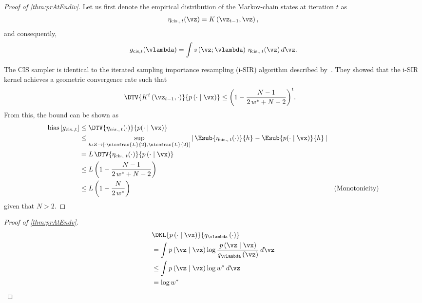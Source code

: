 \prAtEndRestateiv*
\label{proofsection:prAtEndiv}\begin{proof}[Proof of \autoref{thm:prAtEndiv}]\label{proof:prAtEndiv}Let us first denote the empirical distribution of the Markov-chain states at iteration \(t\) as \begin {align} \eta _{\mathrm {cis.},\, t}(\vz ) = K\left (\vz _{t-1}, \vz \right ), \end {align} and consequently, \begin {align} g_{\mathrm {cis}, t}(\vlambda ) = \int s\left (\vz ; \vlambda \right ) \, \eta _{\mathrm {cis.},\, t}(\vz ) \, d\vz . \end {align} \par The CIS sampler is identical to the iterated sampling importance resampling (i-SIR) algorithm described by~\citet {andrieu_uniform_2018}. They showed that the i-SIR kernel achieves a geometric convergence rate such that \begin {align} \DTV {K^{t}\left (\vz _{t-1},\cdot \right )}{p\left (\cdot \mid \vx \right )} &\leq {\left (1 - \frac {N - 1}{2\,w^* + N - 2}\right )}^t. \end {align} From this, the bound can be shown as \begin {align} \mathrm {bias}\left [ g_{\mathrm {cis., t}} \right ] &\leq \DTV {\eta _{cis.,\, t}(\cdot )}{p(\cdot \mid \vx )} \\ &\leq \sup _{h : \mathcal {Z} \rightarrow \left [ \text {-}\nicefrac {L}{2}, \nicefrac {L}{2} \right ]} \left |\, \Esub {\eta _{\mathrm {cis.},\, t}(\cdot )}{h} - \Esub {p(\cdot \mid \vx )}{h} \,\right | \\ &= L \, \DTV { \eta _{\mathrm {cis.},\, t}(\cdot ) }{p\left (\cdot \mid \vx \right )} \\ &\leq L \, {\left (1 - \frac {N - 1}{2\,w^* + N - 2}\right )} \\ &\leq L \, {\left (1 - \frac {N}{2 \, w^*}\right )} &(\text {Monotonicity}) \end {align} given that \(N > 2\).\end{proof}
\prAtEndRestatev*
\label{proofsection:prAtEndv}\begin{proof}[Proof of \autoref{thm:prAtEndv}]\label{proof:prAtEndv}\begin {align} &\DKL {p\left (\cdot \mid \vx \right )}{ q_{\vlambda }\left (\cdot \right ) } \\ &= \int p\left (\vz \mid \vx \right ) \log \frac {p\left (\vz \mid \vx \right )}{q_{\vlambda }\left (\vz \right )}\,d\vz \\ &\leq \int p\left (\vz \mid \vx \right ) \log w^* \, d\vz \\ &= \log w^* \end {align}\end{proof}
